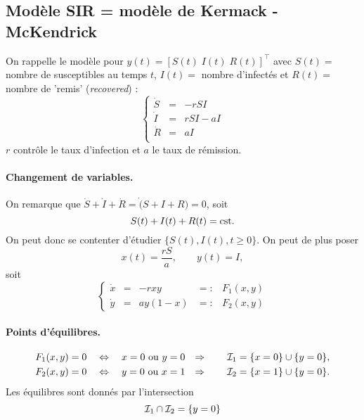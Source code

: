 \subsection{Modèle SIR = modèle de Kermack - McKendrick}

On rappelle le modèle pour $y(t) = [S(t) \; I(t) \; R(t)]^\top$ avec $S(t) =$ nombre de susceptibles au temps $t$, $I(t) =$ nombre d'infectés et $R(t) =$ nombre de 'remis' ({\em recovered}) :
$$
\left\{ \begin{array}{rcl} 
\dot S & = & - r S I \\
\dot I & = & r S I - a I \\
\dot R & = & a I \\
\end{array} \right.
$$
$r$ contrôle le taux d'infection et $a$ le taux de rémission.

\paragraph*{Changement de variables.}
On remarque que $\dot S + \dot I + \dot R = \dot (S + I + R) = 0$, soit 
$$
S(t) + I(t) + R(t) = \text{cst}.
$$
On peut donc se contenter d'étudier $\{S(t), I(t), t \geq 0\}$. On peut de plus poser 
$$
x(t) = \frac{rS}a, \qquad y(t) = I,
$$
soit
$$
\left\{\begin{array}{rclcl}
        \dot x & = & -r x y & =: & F_1(x, y) \\
        \dot y & = & a y (1-x) & =: & F_2(x, y)
       \end{array}\right.
$$

\paragraph*{Points d'équilibres.}
\begin{align*}
  F_1(x, y) & = 0 \quad \Leftrightarrow \quad x = 0 \text{ ou } y = 0 &
  \Rightarrow \qquad \mathcal{I}_1 & = \{x = 0\} \cup \{y = 0\}, \\
  F_2(x, y) & = 0 \quad \Leftrightarrow \quad y = 0 \text{ ou } x = 1 &
  \Rightarrow \qquad \mathcal{I}_2 & = \{x = 1\} \cup \{y = 0\}.
\end{align*}
Les équilibres sont donnés par l'intersection 
$$
\mathcal{I}_1 \cap \mathcal{I}_2 = \{y = 0\}
$$

